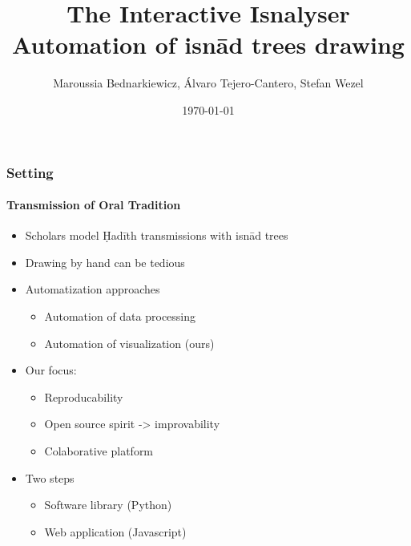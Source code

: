 \documentclass[9pt]{beamer}
\title{The Interactive Isnalyser \\
	\small Automation of isnād trees drawing}
\author{Maroussia Bednarkiewicz, Álvaro Tejero-Cantero, Stefan Wezel}
\institute{mlcolab @ Tübingen University Cluster of Excellence}
\date{\today}
\begin{document}
	

\begin{frame}[plain]
	\titlepage
\end{frame} 



\begin{frame}
\frametitle{Setting}
\framesubtitle{Transmission of Oral Tradition}
\begin{itemize}%
	\item Scholars model Ḥadīth transmissions with isnād trees
	\item Drawing by hand can be tedious
	\item Automatization approaches
	\begin{itemize}
		\item Automation of data processing
		\item Automation of visualization (ours)
	\end{itemize}
	\item Our focus:
	\begin{itemize}
		\item Reproducability
		\item Open source spirit -> improvability
		\item Colaborative platform
	\end{itemize}
	\item Two steps
	\begin{itemize}
		\item Software library (Python)
		\item Web application (Javascript)
	\end{itemize}
\end{itemize}
\end{frame} 
\end{document}
